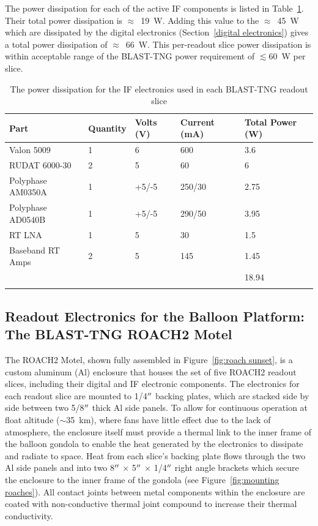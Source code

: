 The power dissipation for each of the active IF components is listed in Table~\ref{tab:if power budget}. Their total power dissipation is $\approx$~19~W. Adding this value to the $\approx$~45~W which are dissipated by the digital electronics (Section~\ref{digital electronics}) gives a total power dissipation of $\approx$~66~W. This per-readout slice power dissipation is within acceptable range of the BLAST-TNG power requirement of $\lesssim$60~W per slice.

\begin{table}[!htbp]
\centering
\begin{tabular}{@{}lllll@{}}
\dtoprule
Part & Quantity & Volts (V) & Current (mA) & Total Power (W) \\ \midrule
Valon 5009 & 1 & 6 & 600 & 3.6 \\
RUDAT 6000-30 & 2 & 5 & 60 & 6 \\
Polyphase AM0350A & 1 & +5/-5 & 250/30 & 2.75 \\
Polyphase AD0540B & 1 & +5/-5 & 290/50 & 3.95 \\
RT LNA & 1 & 5 & 30 & 1.5 \\
Baseband RT Amps & 2 & 5 & 145 & 1.45 \\
 &  &  &  & 18.94 \\ \dbottomrule
\end{tabular}
\caption[~The power dissipation for the IF electronics used in each BLAST-TNG readout slice]{The power dissipation for the IF electronics used in each BLAST-TNG readout slice}
\label{tab:if power budget}
\end{table}

\subsection{Readout Electronics for the Balloon Platform: The BLAST-TNG ROACH2 Motel}

The ROACH2 Motel, shown fully assembled in Figure~\ref{fig:roach sunset}, is a custom aluminum (Al) enclosure that houses the set of five ROACH2 readout slices, including their digital and IF electronic components. The electronics for each readout slice are mounted to 1/4$\operatorname{^{\prime\prime}}$ backing plates, which are stacked side by side between two 5/8$\operatorname{^{\prime\prime}}$ thick Al side panels. To allow for continuous operation at float altitude ($\sim$35~km), where fans have little effect due to the lack of atmosphere, the enclosure itself must provide a thermal link to the inner frame of the balloon gondola to enable the heat generated by the electronics to dissipate and radiate to space. Heat from each slice's backing plate flows through the two Al side panels and into two 8$\operatorname{^{\prime\prime}}$ $\times$ 5$\operatorname{^{\prime\prime}}$ $\times$ 1/4$\operatorname{^{\prime\prime}}$ right angle brackets which secure the enclosure to the inner frame of the gondola (see Figure~\ref{fig:mounting roaches}). All contact joints between metal components within the enclosure are coated with non-conductive thermal joint compound to increase their thermal conductivity.

